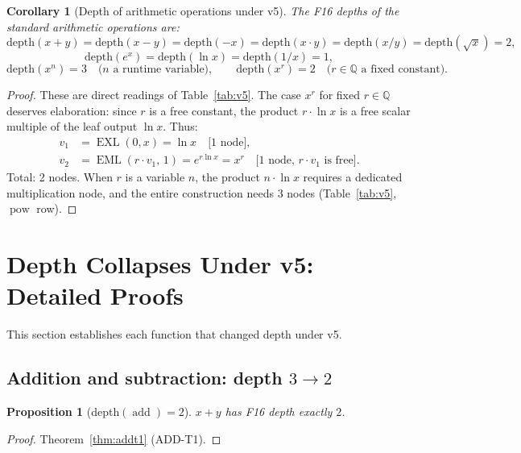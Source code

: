 \documentclass[12pt,a4paper]{article}
\newtheorem{corollary}[theorem]{Corollary}
\newtheorem{proposition}[theorem]{Proposition}
\theoremstyle{definition}
\theoremstyle{remark}
\newcommand{\EML}{\operatorname{EML}}
\newcommand{\EXL}{\operatorname{EXL}}
\newcommand{\addop}{\operatorname{add}}
\newcommand{\powop}{\operatorname{pow}}
\newcommand{\Q}{\mathbb{Q}}
\begin{document}
\begin{corollary}[Depth of arithmetic operations under v5]
\label{cor:arith-depths}
The F16 depths of the standard arithmetic operations are:
\[
  \mathrm{depth}(x+y) = \mathrm{depth}(x-y) = \mathrm{depth}(-x)
  = \mathrm{depth}(x\cdot y) = \mathrm{depth}(x/y) = \mathrm{depth}(\sqrt{x}) = 2,
\]
\[
  \mathrm{depth}(e^x) = \mathrm{depth}(\ln x) = \mathrm{depth}(1/x) = 1,
\]
\[
  \mathrm{depth}(x^n) = 3 \quad\text{($n$ a runtime variable)},
  \qquad
  \mathrm{depth}(x^r) = 2 \quad\text{($r \in \Q$ a fixed constant)}.
\]
\end{corollary}

\begin{proof}
These are direct readings of Table~\ref{tab:v5}.  The case $x^r$ for fixed
$r\in\Q$ deserves elaboration: since $r$ is a free constant, the product $r \cdot \ln x$
is a free scalar multiple of the leaf output $\ln x$.  Thus:
\begin{align*}
  v_1 &= \EXL(0,x) = \ln x \quad\text{[1 node]}, \\
  v_2 &= \EML(r \cdot v_1,\, 1) = e^{r \ln x} = x^r \quad\text{[1 node, $r\cdot v_1$ is free]}.
\end{align*}
Total: 2 nodes.  When $r$ is a variable $n$, the product $n \cdot \ln x$ requires
a dedicated multiplication node, and the entire construction needs $3$ nodes
(Table~\ref{tab:v5}, $\powop$ row).
\end{proof}

\section{Depth Collapses Under v5: Detailed Proofs}
\label{sec:collapses}

This section establishes each function that changed depth under v5.

\subsection{Addition and subtraction: depth $3 \to 2$}

\begin{proposition}[depth$(\addop) = 2$]
$x + y$ has F16 depth exactly $2$.
\end{proposition}

\begin{proof}
Theorem~\ref{thm:addt1} (ADD-T1).
\end{proof}
\end{document}
